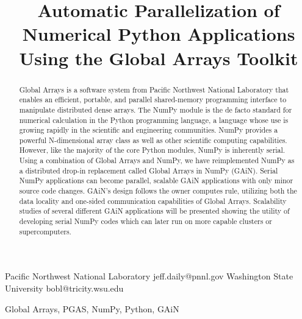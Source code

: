 \documentclass{sigplanconf}
\begin{document}
\copyrightdata{[to be supplied]} 


\title{Automatic Parallelization of Numerical Python Applications Using the
Global Arrays Toolkit}

           {Pacific Northwest National Laboratory}
           {jeff.daily@pnnl.gov}
           {Washington State University}
           {bobl@tricity.wsu.edu}

\maketitle

\DefineShortVerb{\*}

\begin{abstract}
Global Arrays is a software system from Pacific Northwest National Laboratory
that enables an efficient, portable, and parallel shared-memory programming
interface to manipulate distributed dense arrays. The NumPy module is the de
facto standard for numerical calculation in the Python programming language, a
language whose use is growing rapidly in the scientific and engineering
communities. NumPy provides a powerful N-dimensional array class as well as
other scientific computing capabilities. However, like the majority of the
core Python modules, NumPy is inherently serial. Using a combination of Global
Arrays and NumPy, we have reimplemented NumPy as a distributed drop-in
replacement called Global Arrays in NumPy (GAiN). Serial NumPy applications
can become parallel, scalable GAiN applications with only minor source code
changes.  GAiN's design follows the owner computes rule, utilizing both the
data locality and one-sided communication capabilities of Global Arrays.
Scalability studies of several different GAiN applications will be presented
showing the utility of developing serial NumPy codes which can later run on
more capable clusters or supercomputers.
\end{abstract}



\keywords
Global Arrays, PGAS, NumPy, Python, GAiN
\end{document}
